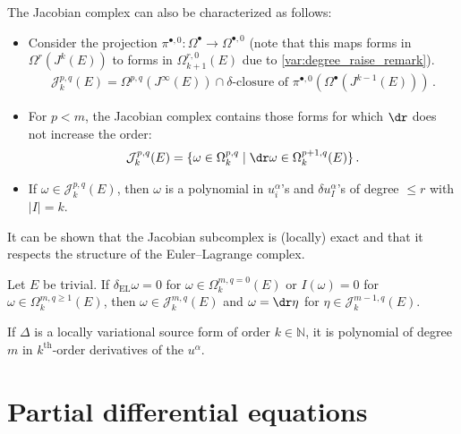     \begin{property}
        The Jacobian complex can also be characterized as follows:
        \begin{itemize}
            \item Consider the projection $\pi^{\bullet,0}:\Omega^\bullet\rightarrow\Omega^{\bullet,0}$ (note that this maps forms in $\Omega^r(J^k(E))$ to forms in $\Omega^{r,0}_{k+1}(E)$ due to \cref{var:degree_raise_remark}).
            \begin{gather}
                \mathcal{J}^{p,q}_k(E) = \Omega^{p,q}(J^\infty(E))\cap\delta\text{-closure of }\pi^{\bullet,0}\left(\Omega^\bullet(J^{k-1}(E))\right)\,.
            \end{gather}
            \item For $p<m$, the Jacobian complex contains those forms for which $\dr$ does not increase the order:
            \begin{gather}
                \mathcal{J}^{p,q}_k(E) = \{\omega\in\Omega^{p,q}_k\mid\dr\omega\in\Omega^{p+1,q}_k(E)\}\,.
            \end{gather}
            \item If $\omega\in\mathcal{J}^{p,q}_k(E)$, then $\omega$ is a polynomial in $u^\alpha_i$'s and $\delta u^\alpha_I$'s of degree $\leq r$ with $|I|=k$.
        \end{itemize}
    \end{property}

    It can be shown that the Jacobian subcomplex is (locally) exact and that it respects the structure of the Euler--Lagrange complex.
    \begin{property}[Exactness]
        Let $E$ be trivial. If $\delta_{\text{EL}}\omega=0$ for $\omega\in\Omega^{m,q=0}_k(E)$ or $I(\omega)=0$ for $\omega\in\Omega^{m,q\geq1}_k(E)$, then $\omega\in\mathcal{J}^{m,q}_k(E)$ and $\omega=\dr\eta$ for $\eta\in\mathcal{J}^{m-1,q}_k(E)$.
    \end{property}

    \begin{property}
        If $\Delta$ is a locally variational source form of order $k\in\mathbb{N}$, it is polynomial of degree $m$ in $k^{\text{th}}$-order derivatives of the $u^\alpha$.
    \end{property}

\section{Partial differential equations}

